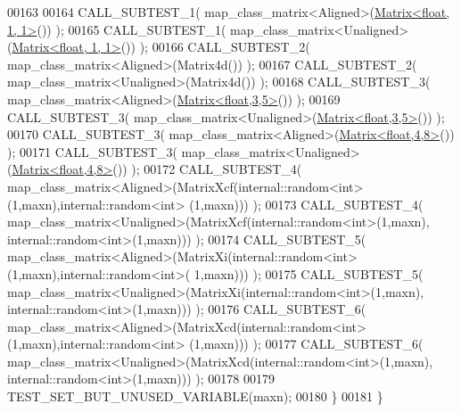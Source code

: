 \begin{DoxyCode}
00163 
00164     CALL\_SUBTEST\_1( map\_class\_matrix<Aligned>(\hyperlink{group___core___module_class_eigen_1_1_matrix}{Matrix<float, 1, 1>}()) );
00165     CALL\_SUBTEST\_1( map\_class\_matrix<Unaligned>(\hyperlink{group___core___module_class_eigen_1_1_matrix}{Matrix<float, 1, 1>}()) );
00166     CALL\_SUBTEST\_2( map\_class\_matrix<Aligned>(Matrix4d()) );
00167     CALL\_SUBTEST\_2( map\_class\_matrix<Unaligned>(Matrix4d()) );
00168     CALL\_SUBTEST\_3( map\_class\_matrix<Aligned>(\hyperlink{group___core___module_class_eigen_1_1_matrix}{Matrix<float,3,5>}()) );
00169     CALL\_SUBTEST\_3( map\_class\_matrix<Unaligned>(\hyperlink{group___core___module_class_eigen_1_1_matrix}{Matrix<float,3,5>}()) );
00170     CALL\_SUBTEST\_3( map\_class\_matrix<Aligned>(\hyperlink{group___core___module_class_eigen_1_1_matrix}{Matrix<float,4,8>}()) );
00171     CALL\_SUBTEST\_3( map\_class\_matrix<Unaligned>(\hyperlink{group___core___module_class_eigen_1_1_matrix}{Matrix<float,4,8>}()) );
00172     CALL\_SUBTEST\_4( map\_class\_matrix<Aligned>(MatrixXcf(internal::random<int>(1,maxn),internal::random<int>
      (1,maxn))) );
00173     CALL\_SUBTEST\_4( map\_class\_matrix<Unaligned>(MatrixXcf(internal::random<int>(1,maxn),
      internal::random<int>(1,maxn))) );
00174     CALL\_SUBTEST\_5( map\_class\_matrix<Aligned>(MatrixXi(internal::random<int>(1,maxn),internal::random<int>(
      1,maxn))) );
00175     CALL\_SUBTEST\_5( map\_class\_matrix<Unaligned>(MatrixXi(internal::random<int>(1,maxn),
      internal::random<int>(1,maxn))) );
00176     CALL\_SUBTEST\_6( map\_class\_matrix<Aligned>(MatrixXcd(internal::random<int>(1,maxn),internal::random<int>
      (1,maxn))) );
00177     CALL\_SUBTEST\_6( map\_class\_matrix<Unaligned>(MatrixXcd(internal::random<int>(1,maxn),
      internal::random<int>(1,maxn))) );
00178     
00179     TEST\_SET\_BUT\_UNUSED\_VARIABLE(maxn);
00180   \}
00181 \}
\end{DoxyCode}
